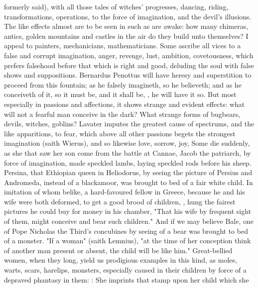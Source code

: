 formerly said), with all those tales of witches' progresses, dancing, riding,
transformations, operations, \etc{} to the force of
imagination, and the devil's
illusions. The like effects almost are to be seen in such as are awake: how
many chimeras, antics, golden mountains and castles in the air do they build
unto themselves? I appeal to painters, mechanicians, mathematicians. Some
ascribe all vices to a false and corrupt imagination, anger, revenge, lust,
ambition, covetousness, which prefers falsehood before that which is right and
good, deluding the soul with false shows and suppositions.
Bernardus Penottus will have heresy and superstition to
proceed from this fountain; as he falsely imagineth, so he believeth; and as he
conceiveth of it, so it must be, and it shall be, , he will
have it so. But most especially in passions and affections, it shows strange
and evident effects: what will not a fearful man conceive in the dark? What
strange forms of bugbears, devils, witches, goblins? Lavater imputes the
greatest cause of spectrums, and the like apparitions, to fear, which above all
other passions begets the strongest imagination (saith
Wierus), and so likewise love, sorrow, joy, \etc{} Some
die suddenly, as she that saw her son come from the battle at Cannae, \etc{}
Jacob the patriarch, by force of imagination, made speckled lambs, laying
speckled rods before his sheep. Persina, that Ethiopian queen in Heliodorus, by
seeing the picture of Persius and Andromeda, instead of a blackamoor, was
brought to bed of a fair white child. In imitation of whom belike, a
hard-favoured fellow in Greece, because he and his wife were both deformed, to
get a good brood of children, , \etc{} hung the fairest pictures he could buy for money in his
chamber, "That his wife by frequent sight of them, might conceive and bear such
children." And if we may believe Bale, one of Pope Nicholas the Third's
concubines by seeing of a bear was brought to bed of a
monster. "If a woman" (saith Lemnius), "at the time of her
conception think of another man present or absent, the child will be like him."
Great-bellied women, when they long, yield us prodigious examples in this kind,
as moles, warts, scars, harelips, monsters, especially caused in their children
by force of a depraved phantasy in them: : She imprints that stamp upon her child which she
